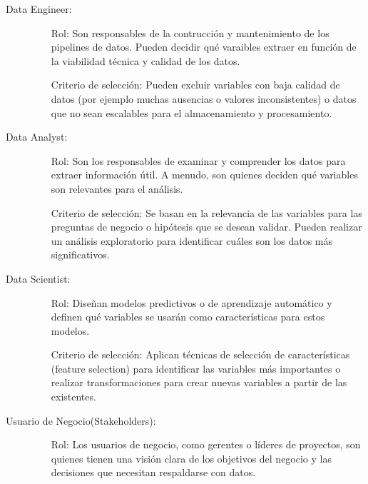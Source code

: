 \begin{description}
    \item[Data Engineer: ]
        \begin{itemize}
            \item[Rol: ]Son responsables de la contrucci\'on  y mantenimiento de los pipelines de datos. Pueden decidir qu\'e varaibles extraer en funci\'on de la viabilidad t\'ecnica y calidad de los datos. 
            \item[Criterio de selecci\'on: ] Pueden excluir variables con baja calidad de datos (por ejemplo muchas ausencias o valores inconsistentes) o datos que no sean escalables para el almacenamiento y procesamiento.
        \end{itemize} 
    \item[Data Analyst: ]
        \begin{itemize}
              \item[Rol: ]Son los responsables de examinar y comprender los datos para extraer informaci\'on \'util. A menudo, 
              son quienes deciden qu\'e variables son relevantes para el an\'alisis.
              \item[Criterio de selecci\'on: ] Se basan en la relevancia de las variables para las preguntas de negocio o hip\'otesis que se desean validar. 
              Pueden realizar un an\'alisis exploratorio para identificar cu\'ales son los datos m\'as significativos.
        \end{itemize}
    \item[Data Scientist: ]
        \begin{itemize}
            \item[Rol: ] Dise\~nan modelos predictivos o de aprendizaje autom\'atico y definen qu\'e variables se usar\'an como caracter\'isticas para estos modelos.
            \item[Criterio de selecci\'on: ] Aplican t\'ecnicas de selecci\'on de caracter\'isticas (feature selection) para identificar las variables m\'as importantes o realizar transformaciones para crear nuevas 
            variables a partir de las existentes.
        \end{itemize}
    \item[Usuario de Negocio(Stakeholders): ]
        \begin{itemize}
            \item[Rol: ] Los usuarios de negocio, como gerentes o l\'ideres de proyectos, son quienes tienen una visi\'on clara de los objetivos del negocio y las decisiones que necesitan respaldarse con datos.

\end{itemize}
\end{description}
